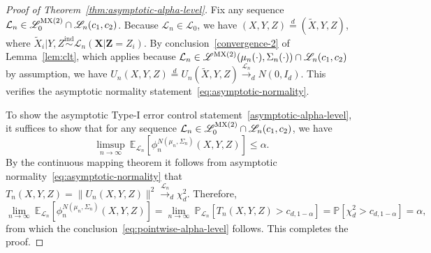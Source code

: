\documentclass[12pt]{article}
\theoremstyle{definition}
\theoremstyle{remark}
\newcommand{\prx}{\bm X}
\newcommand{\srx}{X}
\newcommand{\prz}{\bm Z}
\newcommand{\srz}{Z}
\newcommand{\srxk}{\widetilde X}
\newcommand{\sry}{Y}
\begin{document}
\begin{proof}[Proof of Theorem~\ref{thm:asymptotic-alpha-level}]

Fix any sequence $\mathcal L_n \in \mathscr L_0^{\textnormal{MX(2)}}\cap \mathscr L_n(c_1, c_2)$. Because $\mathcal L_n \in \mathscr L_0$, we have $(\srx, \sry, \srz) \overset d = (\srxk, \sry, \srz)$, where $\srxk_i|\sry,\srz \overset{\text{ind}}\sim \mathcal L_n(\prx|\prz = \srz_i)$. By conclusion~\eqref{convergence-2} of Lemma~\ref{lem:clt}, which applies because $\mathcal L_n \in \mathscr L^{\textnormal{MX(2)}}(\mu_n(\cdot), \Sigma_n(\cdot)) \cap \mathscr L_n(c_1, c_2)$ by assumption, we have $U_n(\srx, \sry,\srz) \overset d = U_n(\srxk, \sry,\srz) \overset{\mathcal L_n}\rightarrow_d N(0, I_d)$. This verifies the asymptotic normality statement~\eqref{eq:asymptotic-normality}.

To show the asymptotic Type-I error control statement~\eqref{asymptotic-alpha-level}, it suffices to show that for any sequence $\mathcal L_n \in \mathscr L_0^{\textnormal{MX(2)}}\cap \mathscr L_n(c_1, c_2)$, we have
	\begin{equation}
		\limsup_{n \rightarrow \infty}\ \mathbb E_{\mathcal L_n}[\phi^{N(\mu_n, \Sigma_n)}_n(\srx, \sry, \srz)] \leq \alpha.
	\label{eq:pointwise-alpha-level}
	\end{equation}
By the continuous mapping theorem it follows from asymptotic normality~\eqref{eq:asymptotic-normality} that $T_n(\srx,\sry,\srz) = \|U_n(\srx, \sry,\srz)\|^2 \overset{\mathcal L_n}\rightarrow_d \chi^2_d$. Therefore,
	\begin{equation*}
		\lim_{n \rightarrow \infty}\ \mathbb E_{\mathcal L_n}[\phi^{N(\mu_n, \Sigma_n)}_n(\srx, \sry, \srz)] = \lim_{n \rightarrow \infty}\ \mathbb P_{\mathcal L_n}[T_n(\srx,\sry,\srz) > c_{d,1-\alpha}] = \mathbb P[\chi^2_d > c_{d,1-\alpha}] = \alpha,
	\end{equation*}
	from which the conclusion~\eqref{eq:pointwise-alpha-level} follows. This completes the proof.
\end{proof}
\end{document}

